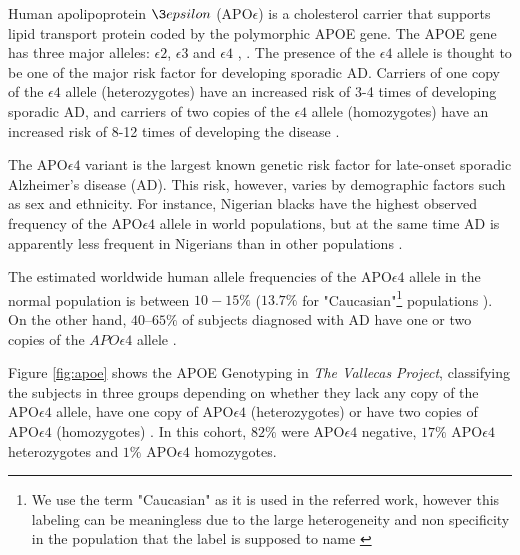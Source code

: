 \documentclass[11pt]{article}
\theoremstyle{definition}
\theoremstyle{remark}
\begin{document}
Human apolipoprotein $\3epsilon$ (APO$\epsilon$) is a cholesterol carrier that supports lipid transport protein coded by the polymorphic APOE gene. The APOE gene has three major alleles: $\epsilon2$, $\epsilon3$ and $\epsilon4$ \cite{mahley2000apolipoprotein}, \cite{hauser2011apolipoprotein}. The presence of the $\epsilon4$ allele is thought to be one of the major risk factor for developing sporadic AD. Carriers of one copy of the  $\epsilon4$ allele (heterozygotes) have an increased risk of 3-4 times of developing sporadic AD, and carriers of two copies of the $\epsilon4$ allele (homozygotes) have an increased risk of 8-12 times of developing the disease \cite{heffernan2016neurobiology}. 

The APO$\epsilon4$ variant is the largest known genetic risk factor for late-onset sporadic Alzheimer's disease (AD). This risk, however, varies by demographic factors such as sex and ethnicity. For instance, Nigerian blacks have the highest observed frequency of the APO$\epsilon4$ allele in world populations, but at the same time AD is apparently less frequent in Nigerians than in other populations \cite{sepehrnia1989genetic}.

The estimated worldwide human allele frequencies of the APO$\epsilon4$ allele in the normal population is between $10-15\%$\cite{myers1996apolipoprotein} ($13.7\%$ for "Caucasian"\footnote{We use the term "Caucasian" as it is used in the referred work, however this labeling can be meaningless due to the large heterogeneity and non specificity in the population that the label is supposed to name \cite{bhopal1998white}} populations \cite{corder1994protective}). 
On the other hand, $40–65\%$ of subjects diagnosed with AD have one or two copies of the $APO\epsilon4$ allele \cite{saunders1993association}. 

Figure \ref{fig:apoe} shows the APOE Genotyping in \emph{The Vallecas Project}, classifying the subjects in three groups depending on whether they lack any copy of the APO$\epsilon4$ allele, have one copy of APO$\epsilon4$ (heterozygotes) or have two copies of APO$\epsilon4$ (homozygotes) \cite{farrer1997effects}. In this cohort, $82\%$ were APO$\epsilon4$ negative, $17\%$ APO$\epsilon4$ heterozygotes and $1\%$ APO$\epsilon4$ homozygotes. 
\end{document}
